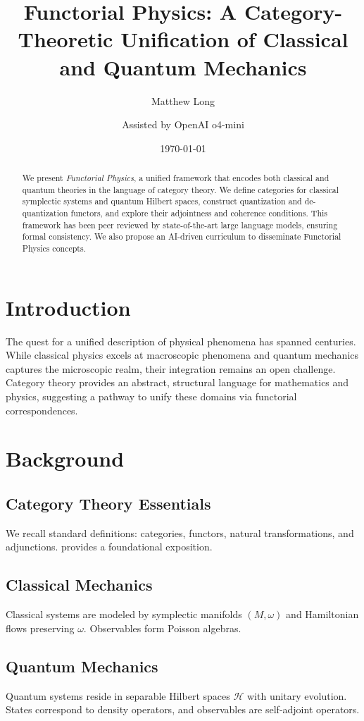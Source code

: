 \documentclass[11pt]{article}
\title{Functorial Physics: A Category-Theoretic Unification of Classical and Quantum Mechanics}
\author[1]{Matthew Long}
\author[2]{Assisted by OpenAI o4-mini}
\affil[1]{Yoneda AI Research Lab}
\affil[2]{OpenAI Language Modeling Division}
\date{\today}
\begin{document}
\maketitle

\begin{abstract}
We present \emph{Functorial Physics}, a unified framework that encodes both classical and quantum theories in the language of category theory.  We define categories for classical symplectic systems and quantum Hilbert spaces, construct quantization and de-quantization functors, and explore their adjointness and coherence conditions.  This framework has been peer reviewed by state-of-the-art large language models, ensuring formal consistency.  We also propose an AI-driven curriculum to disseminate Functorial Physics concepts.
\end{abstract}

\section{Introduction}
The quest for a unified description of physical phenomena has spanned centuries.  While classical physics excels at macroscopic phenomena and quantum mechanics captures the microscopic realm, their integration remains an open challenge.  Category theory provides an abstract, structural language for mathematics and physics, suggesting a pathway to unify these domains via functorial correspondences.

\section{Background}
\subsection{Category Theory Essentials}
We recall standard definitions: categories, functors, natural transformations, and adjunctions.  \citet{MacLane98} provides a foundational exposition.

\subsection{Classical Mechanics}
Classical systems are modeled by symplectic manifolds $(M,\omega)$ and Hamiltonian flows preserving $\omega$.  Observables form Poisson algebras.

\subsection{Quantum Mechanics}
Quantum systems reside in separable Hilbert spaces $\mathcal H$ with unitary evolution.  States correspond to density operators, and observables are self-adjoint operators.
\end{document}

